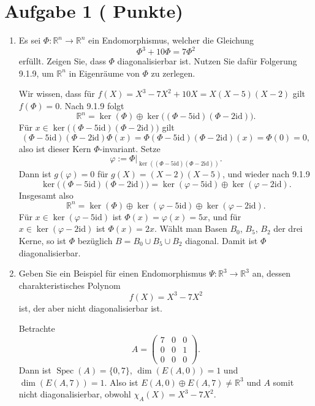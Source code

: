 \documentclass[11pt, a4paper]{article}
\newcommand{\aufgabe}[2]{%
  \section*{\Large\bfseries Aufgabe #1%
  \if\relax\detokenize{#2}\relax\else \hfill\normalfont\normalsize(#2 Punkte)\fi}%
  \vspace{-1.5ex}
}
\begin{document}
\aufgabe{1}{}
\begin{enumerate}
  \item Es sei $\Phi:\mathbb{R}^n\to\mathbb{R}^n$ ein Endomorphismus, welcher die Gleichung
  \[
    \Phi^3+10\Phi=7\Phi^2
  \]
  erfüllt. Zeigen Sie, dass $\Phi$ diagonalisierbar ist. Nutzen Sie dafür Folgerung 9.1.9, um $\mathbb{R}^n$ in Eigenräume von $\Phi$ zu zerlegen.
  \begin{framed}
  Wir wissen, dass für $f(X)=X^3-7X^2+10X=X(X-5)(X-2)$ gilt $f(\Phi)=0$. Nach 9.1.9 folgt
  \[
    \mathbb{R}^n=\ker(\Phi)\oplus\ker\!\big((\Phi-5\mathrm{id})(\Phi-2\mathrm{id})\big).
  \]
  Für $x\in\ker\!\big((\Phi-5\mathrm{id})(\Phi-2\mathrm{id})\big)$ gilt
  \[
    (\Phi-5\mathrm{id})(\Phi-2\mathrm{id})\Phi(x)
     =\Phi(\Phi-5\mathrm{id})(\Phi-2\mathrm{id})(x)=\Phi(0)=0,
  \]
  also ist dieser Kern $\Phi$-invariant. Setze
  \[
    \varphi:=\Phi\big|_{\ker((\Phi-5\mathrm{id})(\Phi-2\mathrm{id}))}.
  \]
  Dann ist $g(\varphi)=0$ für $g(X)=(X-2)(X-5)$, und wieder nach 9.1.9
  \[
    \ker\!\big((\Phi-5\mathrm{id})(\Phi-2\mathrm{id})\big)
      =\ker(\varphi-5\mathrm{id})\oplus\ker(\varphi-2\mathrm{id}).
  \]
  Insgesamt also
  \[
    \mathbb{R}^n=\ker(\Phi)\oplus\ker(\varphi-5\mathrm{id})\oplus\ker(\varphi-2\mathrm{id}).
  \]
  Für $x\in\ker(\varphi-5\mathrm{id})$ ist $\Phi(x)=\varphi(x)=5x$, und für
  $x\in\ker(\varphi-2\mathrm{id})$ ist $\Phi(x)=2x$. Wählt man Basen $B_0$,
  $B_5$, $B_2$ der drei Kerne, so ist $\Phi$ bezüglich
  $B=B_0\cup B_5\cup B_2$ diagonal. Damit ist $\Phi$ diagonalisierbar.
  \end{framed}

  \item Geben Sie ein Beispiel für einen Endomorphismus $\Psi:\mathbb{R}^3\to\mathbb{R}^3$ an, dessen charakteristisches Polynom
  \[
    f(X)=X^3-7X^2
  \]
  ist, der aber nicht diagonalisierbar ist.
  \begin{framed}
  Betrachte
  \[
    A=\begin{pmatrix}
      7&0&0\\
      0&0&1\\
      0&0&0
    \end{pmatrix}.
  \]
  Dann ist $\operatorname{Spec}(A)=\{0,7\}$, $\dim(E(A,0))=1$ und
  $\dim(E(A,7))=1$. Also ist
  $E(A,0)\oplus E(A,7)\neq\mathbb{R}^3$ und $A$ somit nicht diagonalisierbar,
  obwohl $\chi_A(X)=X^3-7X^2$.
  \end{framed}


\end{enumerate}
\end{document}
